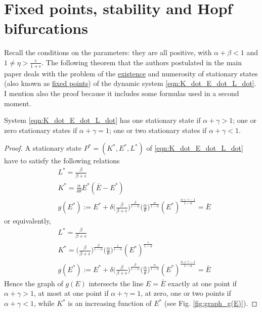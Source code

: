 \section{Fixed points, stability and Hopf bifurcations} \label{Sec:fix_pnt_stab_Hopf_bif}
Recall the conditions on the parameters: they are all positive, with $\alpha+\beta<1$ and $1\neq \eta>\frac{\epsilon}{1+\epsilon}$. The following theorem that the authors postulated in the main paper \cite{antoci_poverty_2011} deals with the problem of the \underline{existence} and numerosity of stationary states (also known as \underline{fixed points}) of the dynamic system \eqref{eqn:K_dot_E_dot_L_dot}. I mention also the proof because it includes some formulas used in a second moment.
\begin{thm} \label{thm:existence_and_num_equilibria}
	System \eqref{eqn:K_dot_E_dot_L_dot} has one stationary state if $\alpha+\gamma>1$; one or zero stationary states if $\alpha+\gamma=1$; one or two stationary states if $\alpha+\gamma<1$.
\end{thm}
\begin{proof}
	A stationary state $P^*=(K^*,E^*,L^*)$ of \eqref{eqn:K_dot_E_dot_L_dot} have to satisfy the following relations 
	\begin{equation} 
		\begin{split}
			&L^* = \frac{\beta}{\beta+\epsilon}\\
			&K^* = \frac{\alpha}{\delta\theta}E^*(\bar{E}-E^*) \\
			&g(E^*):=E^*+ \delta\Big(\frac{\beta}{\beta+\epsilon}\Big)^{\frac{\beta}{1-\alpha}} \Big(\frac{\alpha}{\theta}\Big)^{\frac{\alpha}{1-\alpha}} {(E^*)}^{\frac{\alpha+\gamma-1}{1-\alpha}} =\bar{E}
		\end{split}
	\end{equation}
	or equivalently,
	\begin{equation} \label{eqn:fixed_pnt_satisfy}
		\begin{split}
			&L^* = \frac{\beta}{\beta+\epsilon}\\
			&K^* = \Big(\frac{\beta}{\beta+\epsilon}\Big)^{\frac{\beta}{1-\alpha}} \Big(\frac{\alpha}{\theta}\Big)^{\frac{1}{1-\alpha}}{(E^*)}^{\frac{\gamma}{1-\alpha}} \\
			&g(E^*):=E^*+ \delta\Big(\frac{\beta}{\beta+\epsilon}\Big)^{\frac{\beta}{1-\alpha}} \Big(\frac{\alpha}{\theta}\Big)^{\frac{\alpha}{1-\alpha}} {(E^*)}^{\frac{\alpha+\gamma-1}{1-\alpha}} =\bar{E}
		\end{split}
	\end{equation}
	Hence the graph of $g(E)$ intersects the line $E=\bar{E}$ exactly at one point if $\alpha+\gamma>1$, at most at one point if $\alpha+\gamma=1$, at zero, one or two points if $\alpha+\gamma<1$, while $K^*$ is an increasing function of $E^*$ (see Fig. \ref{fig:graph_g(E)}).  
\end{proof}

